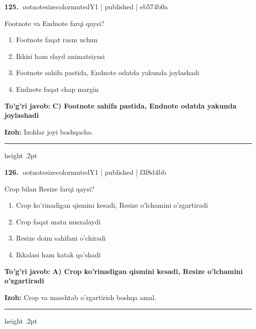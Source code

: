 \documentclass[10pt,a4paper]{article}
\begin{document}
\textbf{\color{ink}125.} {ootnotesizecolor{muted}Y1 | published | eb574b0a}
\par
Footnote va Endnote farqi qaysi?
\begin{enumerate}[label=\Alph*),leftmargin=9mm]
\item Footnote faqat rasm uchun
\item Ikkisi ham slayd animatsiyasi
\item Footnote sahifa pastida, Endnote odatda yakunda joylashadi
\item Endnote faqat chap margin
\end{enumerate}
\begin{tcolorbox}[enhanced,breakable,colback=teal!4,colframe=teal!55!black,boxrule=0.45pt,arc=1.2mm,left=2.8mm,right=2.8mm,top=2mm,bottom=2mm]
\textbf{\color{teal}To'g'ri javob:} \textbf{C) Footnote sahifa pastida, Endnote odatda yakunda joylashadi}
\par\smallskip
\textbf{Izoh:} Izohlar joyi boshqacha.
\end{tcolorbox}
\vspace{2mm}\hrule height .2pt\vspace{2mm}

\textbf{\color{ink}126.} {ootnotesizecolor{muted}Y1 | published | f3f8d4bb}
\par
Crop bilan Resize farqi qaysi?
\begin{enumerate}[label=\Alph*),leftmargin=9mm]
\item Crop ko'rinadigan qismini kesadi, Resize o'lchamini o'zgartiradi
\item Crop faqat matn nusxalaydi
\item Resize doim sahifani o'chiradi
\item Ikkalasi ham katak qo'shadi
\end{enumerate}
\begin{tcolorbox}[enhanced,breakable,colback=teal!4,colframe=teal!55!black,boxrule=0.45pt,arc=1.2mm,left=2.8mm,right=2.8mm,top=2mm,bottom=2mm]
\textbf{\color{teal}To'g'ri javob:} \textbf{A) Crop ko'rinadigan qismini kesadi, Resize o'lchamini o'zgartiradi}
\par\smallskip
\textbf{Izoh:} Crop va masshtab o'zgartirish boshqa amal.
\end{tcolorbox}
\vspace{2mm}\hrule height .2pt\vspace{2mm}
\end{document}
